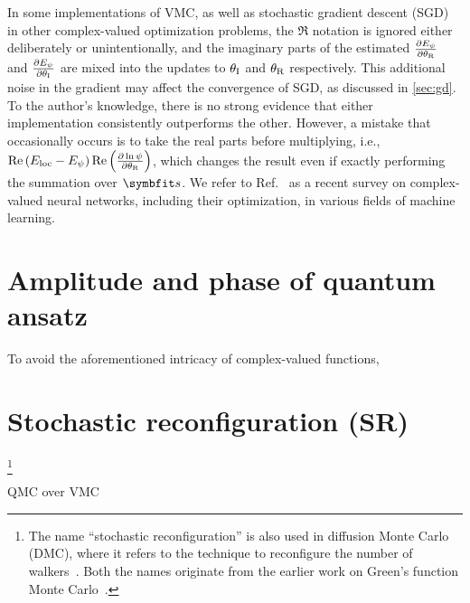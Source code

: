 In some implementations of VMC, as well as stochastic gradient descent (SGD) in other complex-valued optimization problems, the $\Re$ notation is ignored either deliberately or unintentionally, and the imaginary parts of the estimated $\frac{\partial E_\psi}{\partial {\theta_\text{R}}}$ and $\frac{\partial E_\psi}{\partial {\theta_\text{I}}}$ are mixed into the updates to ${\theta_\text{I}}$ and ${\theta_\text{R}}$ respectively. This additional noise in the gradient may affect the convergence of SGD, as discussed in \cref{sec:gd}. To the author's knowledge, there is no strong evidence that either implementation consistently outperforms the other. However, a mistake that occasionally occurs is to take the real parts before multiplying, i.e., $\Re\left( E_\text{loc} - E_\psi \right) \Re\left( \frac{\partial \ln \psi}{\partial {\theta_\text{R}}} \right)$, which changes the result even if exactly performing the summation over $\vs$. We refer to Ref.~\cite{bassey2021survey} as a recent survey on complex-valued neural networks, including their optimization, in various fields of machine learning.

\section{Amplitude and phase of quantum ansatz}

To avoid the aforementioned intricacy of complex-valued functions,







\section{Stochastic reconfiguration (SR)}
\label{sec:sr}

\footnote{The name ``stochastic reconfiguration'' is also used in diffusion Monte Carlo (DMC), where it refers to the technique to reconfigure the number of walkers~\cite{assaraf2000diffusion}. Both the names originate from the earlier work on Green's function Monte Carlo~\cite{sorella1998green}.}

QMC over VMC
